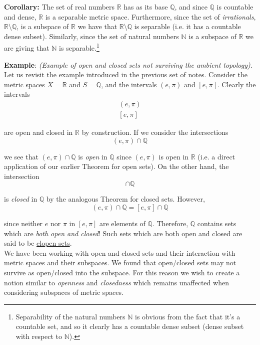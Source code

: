 \documentclass[12pt]{article}
\newlength\tindent
\renewcommand{\indent}{\hspace*{\tindent}}
\newcommand{\R}{\mathbb R}
\newcommand{\N}{\mathbb N}
\newcommand{\Q}{\mathbb Q}
\begin{document}
%
%
{\bf Corollary:} The set of real numbers $\R$ has as its base $\Q$, and since $\Q$ is countable and dense, $\R$ is a separable metric space. Furthermore, since the set of {\em irrationals}, $\R \setminus \Q$, is a subspace of $\R$ we have that $\R \setminus \Q$ is separable (i.e. it has a countable dense subset). Similarly, since the set of natural numbers $\N$ is a subspace of $\R$ we are giving that $\N$ is separable.\footnote{Separability of the natural numbers $\N$ is obvious from the fact that it's a countable set, and so it clearly has a countable dense subset (dense subset with respect to $\N$).}

%
%
{\bf Example}: {\em (Example of open and closed sets not surviving the ambient topology)}. Let us revisit the example introduced in the previous set of notes. Consider the metric spaces $X = \R$ and $S = \Q$, and the intervals $(e,\pi)$ and $[e,\pi]$. Clearly the intervals
\begin{align*}
	(e,\pi) \\
	[e,\pi]
\end{align*}

are open and closed in $\R$ by construction. If we consider the intersections
\begin{equation*}
	(e,\pi) \cap \Q
\end{equation*}

we see that $(e,\pi) \cap \Q$ is {\em open} in $\Q$ since $(e,\pi)$ is open in $\R$ (i.e. a direct application of our earlier Theorem for open sets). On the other hand, the intersection
\begin{equation*}
	[e,\pi] \cap \Q
\end{equation*}

is {\em closed} in $\Q$ by the analogous Theorem for closed sets. However,
\begin{equation*}
	(e,\pi) \cap \Q = [e,\pi] \cap \Q
\end{equation*}

since neither $e$ nor $\pi$ in $[e,\pi]$ are elements of $\Q$. Therefore, $\Q$ contains sets which are {\em both open and closed}! Such sets which are both open and closed are said to be \underline{clopen sets}. \\

\indent We have been working with open and closed sets and their interaction with metric spaces and their subspaces. We found that open/closed sets may not survive as open/closed into the subspace. For this reason we wish to create a notion similar to {\em openness} and {\em closedness} which remains unaffected when considering subspaces of metric spaces. \\
\end{document}
